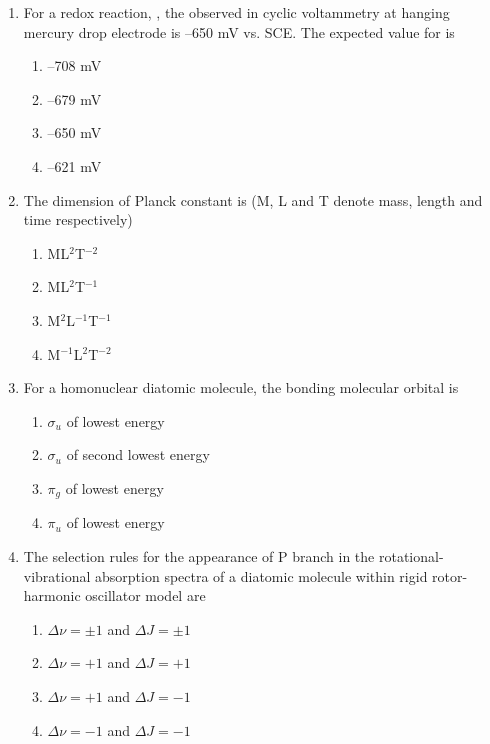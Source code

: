 \documentclass[journal,12pt,onecolumn]{IEEEtran}
\theoremstyle{remark}
\begin{document}
\begin{enumerate}
\item For a redox reaction, , the  observed in cyclic voltammetry at hanging mercury drop electrode is --650 mV vs. SCE. The expected value for  is \hfill{}
\begin{multicols}{2}
\begin{enumerate}[leftmargin=*,labelsep=1em]
     \item   --708 mV
     \item   --679 mV
     \item   --650 mV
     \item   --621 mV
\end{enumerate}
\end{multicols}
 

\item The dimension of Planck constant is (M, L and T denote mass, length and time respectively) \hfill{}
\begin{multicols}{2}
\begin{enumerate}[leftmargin=*,labelsep=1em]
     \item   ML$^2$T$^{-2}$
     \item   ML$^2$T$^{-1}$
     \item   M$^2$L$^{-1}$T$^{-1}$
     \item   M$^{-1}$L$^2$T$^{-2}$
\end{enumerate}
\end{multicols}
 

\item For a homonuclear diatomic molecule, the bonding molecular orbital is \hfill{}
\begin{multicols}{2}
\begin{enumerate}[leftmargin=*,labelsep=1em]
     \item   $\sigma_u$ of lowest energy
     \item   $\sigma_u$ of second lowest energy
     \item   $\pi_g$ of lowest energy
     \item   $\pi_u$ of lowest energy
\end{enumerate}
\end{multicols}
 

\item The selection rules for the appearance of P branch in the rotational-vibrational absorption spectra of a diatomic molecule within rigid rotor-harmonic oscillator model are \hfill{}
\begin{multicols}{2}
\begin{enumerate}[leftmargin=*,labelsep=1em]
     \item   $\Delta \nu = \pm 1$ and $\Delta J = \pm 1$
     \item   $\Delta \nu = +1$ and $\Delta J = +1$
     \item   $\Delta \nu = +1$ and $\Delta J = -1$
     \item   $\Delta \nu = -1$ and $\Delta J = -1$
\end{enumerate}
\end{multicols}
 


\end{enumerate}
\end{document}

